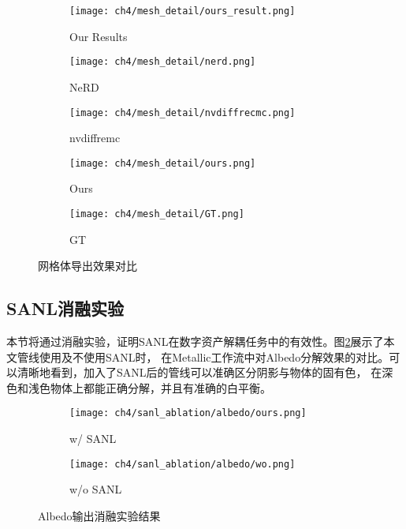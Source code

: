 \begin{figure}[H]
  \centering
  \begin{subfigure}[c]{0.32\textwidth}
    \centering
    \texttt{[image: ch4/mesh\_detail/ours\_result.png]}
    \caption{Our Results}
  \end{subfigure}
  \begin{subfigure}[c]{0.16\textwidth}
    \centering
    \texttt{[image: ch4/mesh\_detail/nerd.png]}
    \caption{NeRD}
  \end{subfigure}
  \hspace{0.1mm}
  \begin{subfigure}[c]{0.16\textwidth}
    \centering
    \texttt{[image: ch4/mesh\_detail/nvdiffrecmc.png]}
    \caption{nvdiffremc}
  \end{subfigure}
  \hspace{0.1mm}
  \begin{subfigure}[c]{0.16\textwidth}
    \centering
    \texttt{[image: ch4/mesh\_detail/ours.png]}
    \caption{Ours}
  \end{subfigure}
  \hspace{0.1mm}
  \begin{subfigure}[c]{0.16\textwidth}
    \centering
    \texttt{[image: ch4/mesh\_detail/GT.png]}
    \caption{GT}
  \end{subfigure}
  \caption{网格体导出效果对比}
  \label{fig:mesh_export_compare}
\end{figure}

\subsection{SANL消融实验}

本节将通过消融实验，证明SANL在数字资产解耦任务中的有效性。图\ref{fig:albedo_ablation}展示了本文管线使用及不使用SANL时，
在Metallic工作流中对Albedo分解效果的对比。可以清晰地看到，加入了SANL后的管线可以准确区分阴影与物体的固有色，
在深色和浅色物体上都能正确分解，并且有准确的白平衡。

\begin{figure}[H]
  \centering
  \begin{subfigure}[c]{0.47\textwidth}
    \centering
    \texttt{[image: ch4/sanl\_ablation/albedo/ours.png]}
    \caption{w/ SANL}
  \end{subfigure}
  \begin{subfigure}[c]{0.47\textwidth}
    \centering
    \texttt{[image: ch4/sanl\_ablation/albedo/wo.png]}
    \caption{w/o SANL}
  \end{subfigure}
  \caption{Albedo输出消融实验结果}
  \label{fig:albedo_ablation}
\end{figure}

